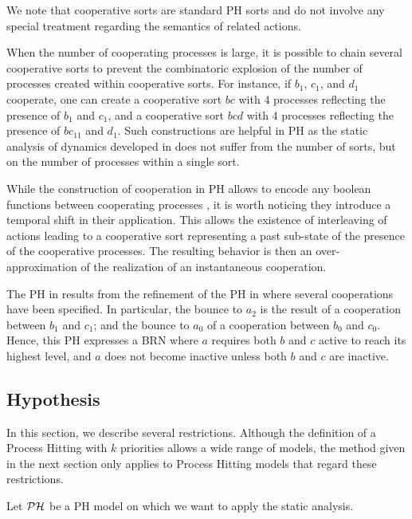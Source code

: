 We note that cooperative sorts are standard PH sorts and do not involve any
special treatment regarding the semantics of related actions.

When the number of cooperating processes is large, it is possible to chain several cooperative sorts
to prevent the combinatoric explosion of the number of processes created within cooperative sorts.
For instance, if $b_1$, $c_1$, and $d_1$ cooperate, one can create a cooperative sort $bc$ with 4
processes reflecting the presence of $b_1$ and $c_1$, and a cooperative sort $bcd$ with 4 processes
reflecting the presence of $bc_{11}$ and $d_1$.  Such constructions are helpful in PH
as the static analysis of dynamics developed in \cite{PMR12-MSCS} does not suffer from the number of
sorts, but on the number of processes within a single sort.

While the construction of cooperation in PH allows to encode any boolean functions
between cooperating processes \cite{PMR10-TCSB}, it is worth noticing they introduce a temporal
shift in their application. 
This allows the existence of interleaving of actions leading to a cooperative sort representing a
past sub-state of the presence of the cooperative processes.
The resulting behavior is then an over-approximation
of the realization of an instantaneous cooperation.

\begin{example}
The PH in  results from the refinement of the PH in 
where several cooperations have been specified.
In particular, the bounce to $a_2$ is the result of a cooperation between $b_1$ and $c_1$; and the
bounce to $a_0$ of a cooperation between $b_0$ and $c_0$.
Hence, this PH expresses a BRN where $a$ requires both $b$ and $c$ active to reach its
highest level, and $a$ does not become inactive unless both $b$ and $c$ are inactive.
\end{example}

\subsection{Hypothesis} 

In this section, we describe several restrictions.
Although the definition of a Process Hitting with $k$ priorities allows a wide range of models, the method given in the next section only applies to Process Hitting models that regard these restrictions.

Let $\mathcal{PH}$ be a PH model on which we want to apply the static analysis.

